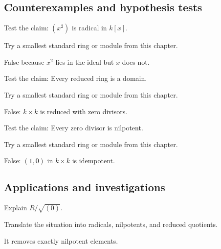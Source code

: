 \subsection*{Counterexamples and hypothesis tests}

\begin{exercise}\label{exr:v03-expand-10}
Test the claim: $(x^2)$ is radical in $k[x]$.
\end{exercise}
\begin{hint}
Try a smallest standard ring or module from this chapter.
\end{hint}
\begin{solution}
False because $x^2$ lies in the ideal but $x$ does not.
\end{solution}

\begin{exercise}\label{exr:v03-expand-11}
Test the claim: Every reduced ring is a domain.
\end{exercise}
\begin{hint}
Try a smallest standard ring or module from this chapter.
\end{hint}
\begin{solution}
False: $k\times k$ is reduced with zero divisors.
\end{solution}

\begin{exercise}\label{exr:v03-expand-12}
Test the claim: Every zero divisor is nilpotent.
\end{exercise}
\begin{hint}
Try a smallest standard ring or module from this chapter.
\end{hint}
\begin{solution}
False: $(1,0)$ in $k\times k$ is idempotent.
\end{solution}

\subsection*{Applications and investigations}

\begin{exercise}\label{exr:v03-expand-13}
Explain $R/\sqrt{(0)}$.
\end{exercise}
\begin{hint}
Translate the situation into radicals, nilpotents, and reduced quotients.
\end{hint}
\begin{solution}
It removes exactly nilpotent elements.
\end{solution}

